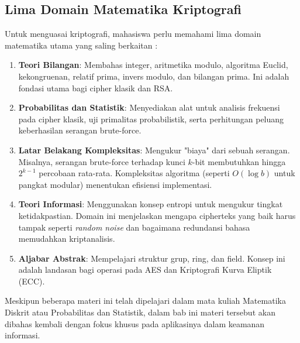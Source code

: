 \subsection{Lima Domain Matematika Kriptografi}

Untuk menguasai kriptografi, mahasiswa perlu memahami lima domain matematika utama yang saling berkaitan \cite{munir_slides_itb}:

\begin{enumerate}
    \item \textbf{Teori Bilangan}: Membahas integer, aritmetika modulo, algoritma Euclid, kekongruenan, relatif prima, invers modulo, dan bilangan prima. Ini adalah fondasi utama bagi cipher klasik dan RSA.
    \item \textbf{Probabilitas dan Statistik}: Menyediakan alat untuk analisis frekuensi pada cipher klasik, uji primalitas probabilistik, serta perhitungan peluang keberhasilan serangan brute-force.
    \item \textbf{Latar Belakang Kompleksitas}: Mengukur "biaya" dari sebuah serangan. Misalnya, serangan brute-force terhadap kunci $k$-bit membutuhkan hingga $2^{k-1}$ percobaan rata-rata. Kompleksitas algoritma (seperti $O(\log b)$ untuk pangkat modular) menentukan efisiensi implementasi.
    \item \textbf{Teori Informasi}: Menggunakan konsep entropi untuk mengukur tingkat ketidakpastian. Domain ini menjelaskan mengapa cipherteks yang baik harus tampak seperti \textit{random noise} dan bagaimana redundansi bahasa memudahkan kriptanalisis.
    \item \textbf{Aljabar Abstrak}: Mempelajari struktur grup, ring, dan field. Konsep ini adalah landasan bagi operasi pada AES dan Kriptografi Kurva Eliptik (ECC).
\end{enumerate}

\begin{catatan}
Meskipun beberapa materi ini telah dipelajari dalam mata kuliah Matematika Diskrit atau Probabilitas dan Statistik, dalam bab ini materi tersebut akan dibahas kembali dengan fokus khusus pada aplikasinya dalam keamanan informasi.
\end{catatan}
